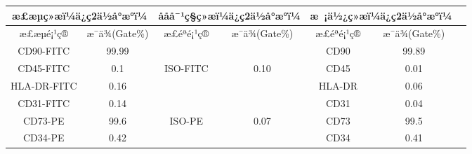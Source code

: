 \documentclass[UTF8,10pt,a4paper,fontset=fandol]{ctexart}
\newcommand{\fieldvalue}[1]{#1}
\newcommand{\handwritten}[1]{#1}
\begin{document}
\small
\begin{tabularx}{\textwidth}{|c|c|c|c|c|c|c|}
\hline
\multicolumn{2}{|c|}{æ£æµç»æï¼ä¿ç2ä½å°æ°ï¼} &
\multicolumn{2}{c|}{ååå¯¹ç§ç»æï¼ä¿ç2ä½å°æ°ï¼} &
\multicolumn{2}{c|}{æ ¡ä½¿ç»æï¼ä¿ç2ä½å°æ°ï¼} \\
\hline
æ£æµé¡¹ç® & æ¯ä¾(Gate\%) & æ£éªé¡¹ç® & æ¯ä¾(Gate\%) & æ£éªé¡¹ç® & æ¯ä¾(Gate\%) \\
\hline
CD90-FITC &
\fieldvalue{\handwritten{99.99}} &
\multicolumn{1}{c|}{} & & CD90 &
\fieldvalue{\handwritten{99.89}} \\
\hline
CD45-FITC &
\fieldvalue{\handwritten{0.1}} &
\multirow{3}{*}{ISO-FITC} &
\fieldvalue{\handwritten{0.10}} &
CD45 &
\fieldvalue{\handwritten{0.01}} \\
\hline
HLA-DR-FITC &
\fieldvalue{\handwritten{0.16}} & & & HLA-DR &
\fieldvalue{\handwritten{0.06}} \\
\hline
CD31-FITC & 
\fieldvalue{\handwritten{0.14}} & & & CD31 &
\fieldvalue{\handwritten{0.04}} \\
\hline
CD73-PE &
\fieldvalue{\handwritten{99.6}} &
\multirow{2}{*}{ISO-PE} &
\fieldvalue{\handwritten{0.07}} &
CD73 &
\fieldvalue{\handwritten{99.5}} \\
\hline
CD34-PE &
\fieldvalue{\handwritten{0.42}} & & & CD34 &
\fieldvalue{\handwritten{0.41}} \\

\end{tabularx}
\end{document}
